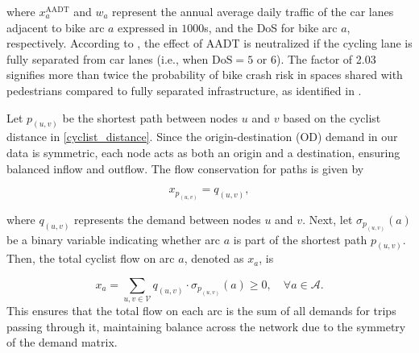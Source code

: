 \documentclass[letterpaper, 10 pt, conference]{ieeeconf}  %
\begin{document}






where $x^{\text{AADT}}_{a}$ and $w_{a}$ represent the annual average daily traffic of the car lanes adjacent to bike arc $a$ expressed in $1000$s, and the DoS for bike arc $a$, respectively. According to \cite{cyclerap2024}, the effect of AADT is neutralized if the cycling lane is fully separated from car lanes (i.e., when $\text{DoS} = 5$ or $6$). The factor of 2.03 signifies more than twice the probability of bike crash risk in spaces shared with pedestrians compared to fully separated infrastructure, as identified in \cite{mesimaki2021near}.


Let $p_{(u,v)}$ be the shortest path between nodes $u$ and $v$ based on the cyclist distance in \eqref{cyclist_distance}. Since the origin-destination (OD) demand in our data is symmetric, each node acts as both an origin and a destination, ensuring balanced inflow and outflow. The flow conservation for paths is given by

\begin{equation}
\label{eq_shortest_path}
    x_{p_{(u,v)}} = q_{(u,v)},
\end{equation}

where $q_{(u,v)}$ represents the demand between nodes $u$ and $v$. Next, let $\sigma_{p_{(u,v)}}(a)$ be a binary variable indicating whether arc $a$ is part of the shortest path $p_{(u,v)}$. Then, the total cyclist flow on arc $a$, denoted as $x_a$, is

\begin{equation}
\label{eq_flows}
  x_{a} = \sum_{u,v \in \mathcal{V}} q_{(u,v)} \cdot \sigma_{p_{(u,v)}}(a) \geq 0, \quad \forall a \in \mathcal{A}.
\end{equation}
This ensures that the total flow on each arc is the sum of all demands for trips passing through it, maintaining balance across the network due to the symmetry of the demand matrix.
\end{document}

